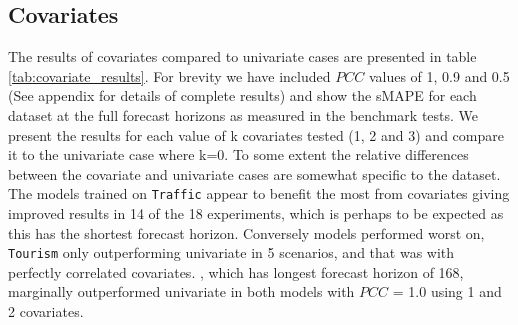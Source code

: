 \documentclass[letterpaper]{article}
\newcommand{\pearson}{PCC}
\begin{document}
\subsection{Covariates}
The results of covariates compared to univariate cases are presented in table \ref{tab:covariate_results}. For brevity we have included $\pearson$ values of 1, 0.9 and 0.5 (See appendix for details of complete 
results) and show the sMAPE for each dataset at the full forecast horizons as measured in the benchmark tests. We present the results for each value of k covariates tested (1, 2 and 3) and 
compare it to the univariate case where k=0. To some extent the relative differences between the covariate and univariate cases are somewhat specific to the 
dataset. The models trained on \texttt{Traffic} appear to benefit the most from covariates giving improved results in 14 of the 18 experiments, which is perhaps to be expected 
as this has the shortest forecast horizon. Conversely models performed worst on, \texttt{Tourism} only outperforming univariate in 5 scenarios, and that was with perfectly correlated covariates.
, which has longest forecast horizon of 168, marginally outperformed univariate in both models with $\pearson$ = 1.0 using 1 and 2 covariates. 
\end{document}

